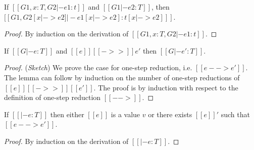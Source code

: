 \begin{lem}\label{lem:ecore:subst}
	If $[[G1, x:T, G2 |- e1:t]]$ and $[[G1 |- e2:T]]$, then $[[G1, G2 [x |-> e2] |- e1[x |-> e2]  : t[x |-> e2] ]]$.
\end{lem}

\begin{proof}
    By induction on the derivation of $[[G1, x:T, G2 |- e1:t]]$.
\end{proof}

\begin{lem}\label{lem:ecore:reduct}
If $[[G |- e:T]]$ and $[[e]] [[->>]] e'$ then $[[G |- e':T]]$.
\end{lem}

\begin{proof}
    (\emph{Sketch}) We prove the case for one-step reduction, i.e. $[[e --> e']]$. The lemma can follow by induction on the number of one-step reductions of $[[e]] [[->>]] [[e']]$.
    The proof is by induction with respect to the definition of one-step reduction $[[-->]]$.
\end{proof}

\begin{lem}[Progress]\label{lem:ecore:prog}
If $[[|- e:T]]$ then either $[[e]]$ is a value $v$ or there exists $[[e]]'$ such that $[[e --> e']]$.
\end{lem}

\begin{proof}
    By induction on the derivation of $[[|- e:T]]$.
\end{proof}
